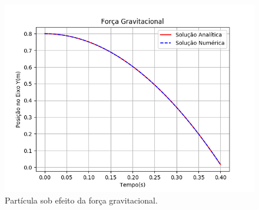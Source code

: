 \documentclass{beamer}
\begin{document}
\begin{frame}
\begin{minipage}{.48\textwidth}
\begin{figure}
{	\includegraphics[height=0.38\textheight]{figure/validations/Forces_gravitational_validation.png}
      } {\raggedleft \tiny Partícula sob efeito da força gravitacional.}
    \end{figure}
  \end{minipage}
  

\end{frame}
\end{document}
